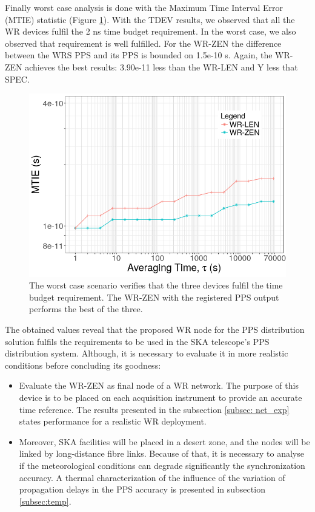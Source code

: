 Finally worst case analysis is done with the Maximum Time Interval Error (MTIE) 
statistic (Figure \ref{fig:mtie_exp1}). With the TDEV results, we observed that 
all the WR devices fulfil the 2 ns time budget requirement. In the worst case, 
we also observed that requirement is well fulfilled. For the WR-ZEN the 
difference between the WRS PPS and its PPS is bounded on 1.5e-10 s. Again, the 
WR-ZEN achieves the best results: 3.90e-11 less than the WR-LEN and Y less that 
SPEC.

\begin{figure}
	\centering
	\includegraphics[width=0.7\linewidth]{img/mtie_exp1}
	\caption[MTIE for the WR devices comparison.]{The worst case scenario 
	verifies that the three devices fulfil the time budget requirement. The 
	WR-ZEN with the registered PPS output performs the best of the three.}
	\label{fig:mtie_exp1}
\end{figure}


The obtained values reveal that the proposed WR node for the PPS distribution 
solution fulfils the requirements to be used in the SKA telescope's PPS 
distribution system. Although, it is necessary to evaluate it in more realistic 
conditions before concluding its goodness:

\begin{itemize}
	\item Evaluate the WR-ZEN as final node of a WR network. The purpose of 
	this device is to be placed on each acquisition instrument to provide an 
	accurate time reference. The results presented in the subsection 
	\ref{subsec: net_exp} states performance for a realistic WR deployment.
	
	\item Moreover, SKA facilities will be placed in a desert zone, and 
	the nodes will be linked by long-distance fibre links. Because of that, 
	it is
	necessary to analyse if the meteorological conditions can degrade 
	significantly the synchronization accuracy. A thermal characterization of 
	the influence of the variation of propagation delays in the PPS accuracy is 
	presented in subsection \ref{subsec:temp}.
\end{itemize}   

